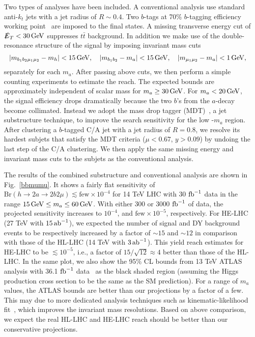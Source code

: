 Two types of analyses have been included. A conventional analysis use standard anti-$k_t$ jets with a jet radius of $R\sim 0.4$. Two $b$-tags at 70\% $b$-tagging efficiency working point~\cite{ATLAS:2014cal}  are imposed to the final states. A missing transverse energy cut of $\slashed{E}_T < 30 \,\mathrm{GeV}$ suppresses $t \bar t$ background. In addition we make use of the double-resonance structure of the signal by imposing invariant mass cuts 
\begin{align}
|m_{b_1 b_2 \mu_1 \mu_2}-m_h|< 15\,\mathrm{GeV},\quad |m_{b_1 b_2}-m_a|< 15\,\mathrm{GeV},\quad|m_{\mu_1\mu_2}-m_a| < 1\,\mathrm{GeV},
\end{align}
separately for each $m_a$. After passing above cuts, we then perform a simple counting experiments to estimate the reach. The expected bounds are approximately independent of scalar mass for $m_a \geq 30 \,\mathrm{GeV}$. For $m_a < 20 \,\mathrm{GeV}$, the signal efficiency drops dramatically because the two $b$'s from the $a$-decay become collimated. Instead we adopt the mass drop tagger (MDT)~\cite{Butterworth:2008sd}, a jet substructure technique, to improve the search sensitivity for the low -$m_a$ region. After clustering a $b$-tagged C/A  jet with a jet radius of $R=0.8$, we resolve its hardest subjets that satisfy the MDT criteria ($\mu < 0.67$, $y>0.09$) by undoing the last step of the C/A clustering. We then apply the same missing energy and invariant mass cuts to the subjets as the conventional analysis.

The results of the combined substructure and conventional analysis are shown in Fig.~\ref{bbmumu}. It shows a fairly flat sensitivity of  $\mathrm{Br}(h \to 2a \to 2b2\mu) \lesssim \text{few}\times10^{-4}$ for 14 TeV LHC with 30 ${\rm fb}^{-1}$ data in the range $15\,\mathrm{GeV} \leq m_a \leq 60 \,\mathrm{GeV}$. With either 300 or 3000 ${\rm fb}^{-1}$ of data, the projected sensitivity increases to  $10^{-4}$, and $\text{few}\times 10^{-5}$, respectively. For HE-LHC (27 TeV with $15\,{\rm ab}^{-1}$), we expected the number of signal and DY background events to be respectively increased by a factor of $\sim15$ and $\sim12$ in comparison with those of the HL-LHC (14 TeV with $3\,{\rm ab}^{-1}$). This yield reach estimates for HE-LHC to be 
$\lesssim 10^{-5}$, i.e., a factor of $15/\sqrt{12}\approx 4$ better than those of the HL-LHC. In the same plot, we also show the 95\% CL bounds from 13 TeV ATLAS analysis with 36.1 ${\rm fb}^{-1}$ data~\cite{Aaboud:2018esj} as the black shaded region (assuming the Higgs production cross section to be the same as the SM prediction). For a range of $m_a$ values, the ATLAS bounds are better than our projections  by a factor of a few. This may due to more dedicated analysis techniques such as kinematic-likelihood fit~\cite{Aaboud:2018esj}, which improves the invariant mass resolutions. Based on above comparison, we expect the real HL-LHC and HE-LHC reach should be better than our conservative projections. 



